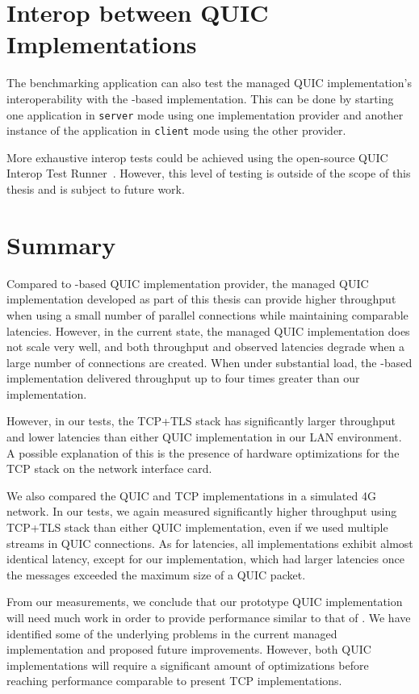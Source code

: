 \section{Interop between QUIC Implementations}

The benchmarking application can also test the managed QUIC implementation's interoperability with
the \libmsquic{}-based implementation. This can be done by starting one application in
\texttt{server} mode using one implementation provider and another instance of the application in
\texttt{client} mode using the other provider.

More exhaustive interop tests could be achieved using the open-source QUIC Interop Test
Runner~\cite{QuicInteropRunner}. However, this level of testing is outside of the scope of this
thesis and is subject to future work.

\section{Summary}

Compared to \libmsquic{}-based QUIC implementation provider, the managed QUIC implementation
developed as part of this thesis can provide higher throughput when using a small number of parallel
connections while maintaining comparable latencies. However, in the current state, the managed QUIC
implementation does not scale very well, and both throughput and observed latencies degrade when a
large number of connections are created. When under substantial load, the \libmsquic{}-based
implementation delivered throughput up to four times greater than our implementation.

However, in our tests, the TCP+TLS stack has significantly larger throughput and lower latencies
than either QUIC implementation in our LAN environment. A possible explanation of this is the
presence of hardware optimizations for the TCP stack on the network interface card.

We also compared the QUIC and TCP implementations in a simulated 4G network. In our tests, we again
measured significantly higher throughput using TCP+TLS stack than either QUIC implementation, even
if we used multiple streams in QUIC connections. As for latencies, all implementations exhibit
almost identical latency, except for our implementation, which had larger latencies once the
messages exceeded the maximum size of a QUIC packet.

From our measurements, we conclude that our prototype QUIC implementation will need much work in
order to provide performance similar to that of \libmsquic{}. We have identified some of the
underlying problems in the current managed implementation and proposed future improvements. However,
both QUIC implementations will require a significant amount of optimizations before reaching
performance comparable to present TCP implementations.
